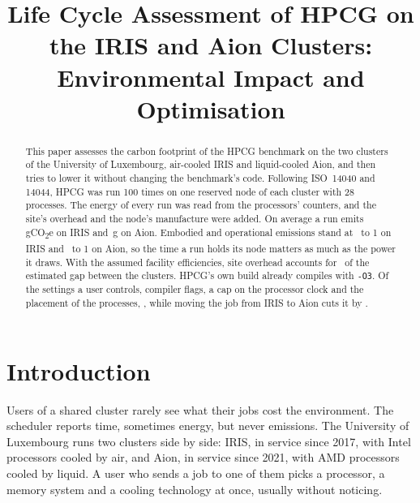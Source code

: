 \documentclass[conference,a4paper]{IEEEtran}
\begin{document}
\title{Life Cycle Assessment of HPCG on the IRIS and Aion Clusters: Environmental Impact and Optimisation}

\author{
}

\maketitle

\begin{abstract}
This paper assesses the carbon footprint of the HPCG benchmark on the two
clusters of the University of Luxembourg, air-cooled IRIS and liquid-cooled
Aion, and then tries to lower it without changing the benchmark's code.
Following ISO~14040 and 14044, HPCG was run 100 times on one reserved node of
each cluster with 28 processes. The energy of every run was read from the
processors' counters, and the site's overhead and the node's manufacture were
added. On average a run emits \IrisGrams\,gCO\textsubscript{2}e on IRIS and
\AionGrams\,g on Aion. Embodied and operational emissions stand at
\IrisEmbOpRatio\ to 1 on IRIS and \AionEmbOpRatio\ to 1 on Aion, so the time a
run holds its node matters as much as the power it draws. With the assumed
facility efficiencies, site overhead accounts for \GapShareSite\ of the
estimated gap between the clusters.
HPCG's own build already compiles with \texttt{-O3}. Of the settings a user
controls, compiler flags, a cap on the processor clock and the placement of the
processes, \OptBestText, while
moving the job from IRIS to Aion cuts it by \AionSave.
\end{abstract}


\section{Introduction}\label{sec:intro}

Users of a shared cluster rarely see what their jobs cost the environment. The
scheduler reports time, sometimes energy, but never emissions. The University of
Luxembourg runs two clusters side by side: IRIS, in service since 2017, with
Intel processors cooled by air, and Aion, in service since 2021, with AMD
processors cooled by liquid. A user who sends a job to one of them picks a
processor, a memory system and a cooling technology at once, usually without
noticing.
\end{document}
